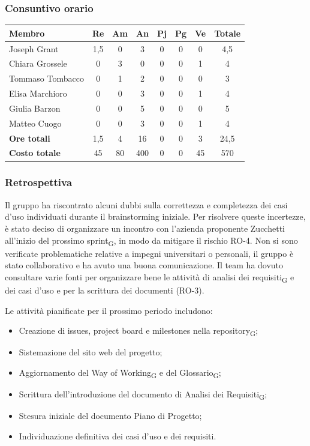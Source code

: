 \documentclass[11pt,a4paper]{article}
\newcommand{\gls}[1]{#1\textsubscript{G}}
\begin{document}
\subsubsection{Consuntivo orario}
\begin{center}
    \begin{tabular}{|l|c|c|c|c|c|c|c|}
        \hline
        \textbf{Membro} & \textbf{Re} & \textbf{Am} & \textbf{An} & \textbf{Pj} & \textbf{Pg} & \textbf{Ve} & \textbf{Totale} \\
        \hline
        Joseph Grant & 1,5 & 0 & 3 & 0 & 0 & 0 & 4,5 \\
        \hline
        Chiara Grossele & 0 & 3 & 0 & 0 & 0 & 1 & 4 \\
        \hline
        Tommaso Tombacco & 0 & 1 & 2 & 0 & 0 & 0 & 3 \\
        \hline
        Elisa Marchioro & 0 & 0 & 3 & 0 & 0 & 1 & 4 \\
        \hline
        Giulia Barzon & 0 & 0 & 5 & 0 & 0 & 0 & 5 \\
        \hline
        Matteo Cuogo & 0 & 0 & 3 & 0 & 0 & 1 & 4 \\
        \hline
        \textbf{Ore totali} & 1,5 & 4 & 16 & 0 & 0 & 3 & 24,5 \\
        \hline
        \textbf{Costo totale} & 45 & 80 & 400 & 0 & 0 & 45 & 570 \\
        \hline
    \end{tabular}
\end{center}

\subsubsection{Retrospettiva}
Il gruppo ha riscontrato alcuni dubbi sulla correttezza e completezza dei casi d'uso individuati durante il brainstorming iniziale. Per risolvere queste incertezze, è stato deciso di organizzare un incontro con l'azienda proponente Zucchetti all'inizio del prossimo \gls{sprint}, in modo da mitigare il rischio RO-4.
Non si sono verificate problematiche relative a impegni universitari o personali, il gruppo è stato collaborativo e ha avuto una buona comunicazione. Il team ha dovuto consultare varie fonti per organizzare bene le attività di \gls{analisi dei requisiti} e dei casi d'uso e per la scrittura dei documenti (RO-3).

Le attività pianificate per il prossimo periodo includono:
\begin{itemize}
    \item Creazione di issues, project board e milestones nella \gls{repository};
    \item Sistemazione del sito web del progetto;
    \item Aggiornamento del \gls{Way of Working} e del \gls{Glossario};
    \item Scrittura dell'introduzione del documento di \gls{Analisi dei Requisiti};
    \item Stesura iniziale del documento Piano di Progetto;
    \item Individuazione definitiva dei casi d'uso e dei requisiti.
\end{itemize}
\end{document}
